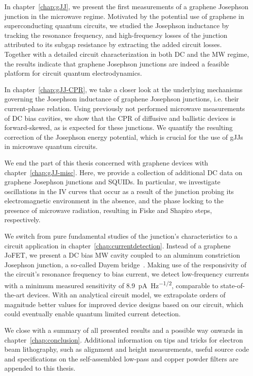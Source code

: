 In chapter~\ref{chap:gJJ}, we present the first measurements of a graphene Josephson junction in the microwave regime.
%
Motivated by the potential use of graphene in superconducting quantum circuits, we studied the Josephson inductance by tracking the resonance frequency, and high-frequency losses of the junction attributed to its subgap resistance by extracting the added circuit losses.
%
Together with a detailed circuit characterization in both DC and the MW regime, the results indicate that graphene Josephson junctions are indeed a feasible platform for circuit quantum electrodynamics.


In chapter~\ref{chap:gJJ-CPR}, we take a closer look at the underlying mechanisms governing the Josephson inductance of graphene Josephson junctions, i.e. their current-phase relation.
%
Using previously not performed microwave measurements of DC bias cavities, we show that the CPR of diffusive and ballistic devices is forward-skewed, as is expected for these junctions.
%
We quantify the resulting correction of the Josephson energy potential, which is crucial for the use of gJJs in microwave quantum circuits.

We end the part of this thesis concerned with graphene devices with chapter~\ref{chap:gJJ-misc}.
%
Here, we provide a collection of additional DC data on graphene Josephson junctions and SQUIDs.
%
In particular, we investigate oscillations in the IV curves that occur as a result of the junction probing its electromagnetic environment in the absence, and the phase locking to the presence of microwave radiation, resulting in Fiske and Shapiro steps, respectively.


We switch from pure fundamental studies of the junction's characteristics to a circuit application in chapter~\ref{chap:currentdetection}.
%
Instead of a graphene JoFET, we present a DC bias MW cavity coupled to an aluminum constriction Josephson junction, a so-called Dayem bridge~\cite{andersonRadioFrequencyEffectsSuperconducting1964}.
%
Making use of the responsivity of the circuit's resonance frequency to bias current, we detect low-frequency currents with a minimum measured sensitivity of \SI{8.9}{\pico\ampere\per\hertz\tothe{1/2}}, comparable to state-of-the-art devices.
%
With an analytical circuit model, we extrapolate orders of magnitude better values for improved device designs based on our circuit, which could eventually enable quantum limited current detection.


We close with a summary of all presented results and a possible way onwards in chapter~\ref{chap:conclusion}.
%
Additional information on tips and tricks for electron beam lithography, such as alignment and height measurements, useful source code and specifications on the self-assembled low-pass and copper powder filters are appended to this thesis.



